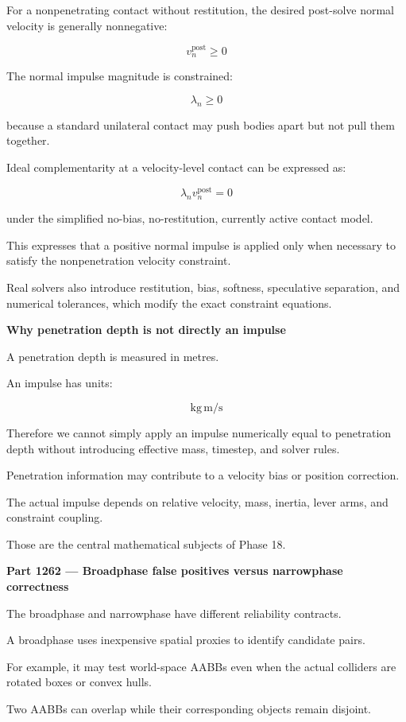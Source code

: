 For a nonpenetrating contact without restitution, the desired post-solve normal velocity is generally nonnegative:

\[
\boxed{ v_n^{\mathrm{post}}\ge0 }
\]

The normal impulse magnitude is constrained:

\[
\boxed{ \lambda_n\ge0 }
\]

because a standard unilateral contact may push bodies apart but not pull them together.

Ideal complementarity at a velocity-level contact can be expressed as:

\[
\boxed{ \lambda_n v_n^{\mathrm{post}}=0 }
\]

under the simplified no-bias, no-restitution, currently active contact model.

This expresses that a positive normal impulse is applied only when necessary to satisfy the nonpenetration velocity constraint.

Real solvers also introduce restitution, bias, softness, speculative separation, and numerical tolerances, which modify the exact constraint equations.

\textbf{Why penetration depth is not directly an impulse}

A penetration depth is measured in metres.

An impulse has units:

\[
\mathrm{kg\,m/s}
\]

Therefore we cannot simply apply an impulse numerically equal to penetration depth without introducing effective mass, timestep, and solver rules.

Penetration information may contribute to a velocity bias or position correction.

The actual impulse depends on relative velocity, mass, inertia, lever arms, and constraint coupling.

Those are the central mathematical subjects of Phase 18.

\textbf{Part 1262 --- Broadphase false positives versus narrowphase correctness}

The broadphase and narrowphase have different reliability contracts.

A broadphase uses inexpensive spatial proxies to identify candidate pairs.

For example, it may test world-space AABBs even when the actual colliders are rotated boxes or convex hulls.

Two AABBs can overlap while their corresponding objects remain disjoint.

